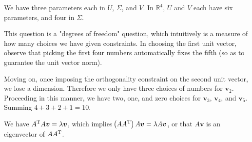 \documentclass[a4paper]{article}
\begin{document}
\vspace{12pt}


We have three parameters each in \(U\), \(\Sigma\), and \(V\). In \(\mathbb{R}^{4}\), \(U\) and \(V\) each have six parameters, and four in \(\Sigma\).

\vspace{12pt}


This question is a "degrees of freedom" question, which intuitively is a measure of how many choices we have given constraints. In choosing the first unit vector, observe that picking the first four numbers automatically fixes the fifth (so as to guarantee the unit vector norm). 

Moving on, once imposing the orthogonality constraint on the second unit vector, we lose a dimension. Therefore we only have three choices of numbers for \(\bm{v}_{2}\). Proceeding in this manner, we have two, one, and zero choices for \(\bm{v}_{3}\), \(\bm{v}_{4}\), and \(\bm{v}_{5}\). Summing \(4 + 3 + 2 + 1 = 10\).

\vspace{12pt}


We have \(A^{\textsc{T}}A \bm{v} = \lambda \bm{v}\), which implies \(\!\left( AA^{\textsc{T}} \right) A \bm{v} = \lambda A \bm{v}\), or that \(A \bm{v}\) is an eigenvector of \(AA^{\textsc{T}}\).

\vspace{12pt}

\end{document}
